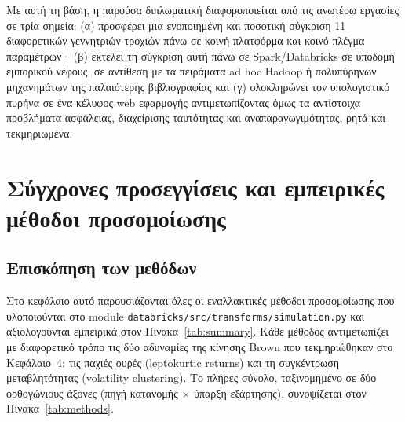 \documentclass[12pt]{article}
\begin{document}
Με αυτή τη βάση, η παρούσα διπλωματική διαφοροποιείται από τις ανωτέρω εργασίες σε τρία σημεία: (α) προσφέρει μια ενοποιημένη και ποσοτική σύγκριση 11 διαφορετικών γεννητριών τροχιών πάνω σε κοινή πλατφόρμα και κοινό πλέγμα παραμέτρων· (β) εκτελεί τη σύγκριση αυτή πάνω σε Spark/Databricks σε υποδομή εμπορικού νέφους, σε αντίθεση με τα πειράματα ad hoc Hadoop ή πολυπύρηνων μηχανημάτων της παλαιότερης βιβλιογραφίας και (γ) ολοκληρώνει τον υπολογιστικό πυρήνα σε ένα κέλυφος web εφαρμογής αντιμετωπίζοντας όμως τα αντίστοιχα προβλήματα ασφάλειας, διαχείρισης ταυτότητας και αναπαραγωγιμότητας, ρητά και τεκμηριωμένα.

\newpage

\section{Σύγχρονες προσεγγίσεις και εμπειρικές μέθοδοι προσομοίωσης}

\subsection{Επισκόπηση των μεθόδων}
Στο κεφάλαιο αυτό παρουσιάζονται όλες οι εναλλακτικές μέθοδοι προσομοίωσης που υλοποιούνται στο module \texttt{databricks/src/transforms/simulation.py} και αξιολογούνται εμπειρικά στον Πίνακα~\ref{tab:summary}. Κάθε μέθοδος αντιμετωπίζει με διαφορετικό τρόπο τις δύο αδυναμίες της κίνησης Brown που τεκμηριώθηκαν στο Κεφάλαιο~4: τις παχιές ουρές (leptokurtic returns) και τη συγκέντρωση μεταβλητότητας (volatility clustering). Το πλήρες σύνολο, ταξινομημένο σε δύο ορθογώνιους άξονες (πηγή κατανομής $\times$ ύπαρξη εξάρτησης), συνοψίζεται στον Πίνακα~\ref{tab:methods}.
\end{document}
